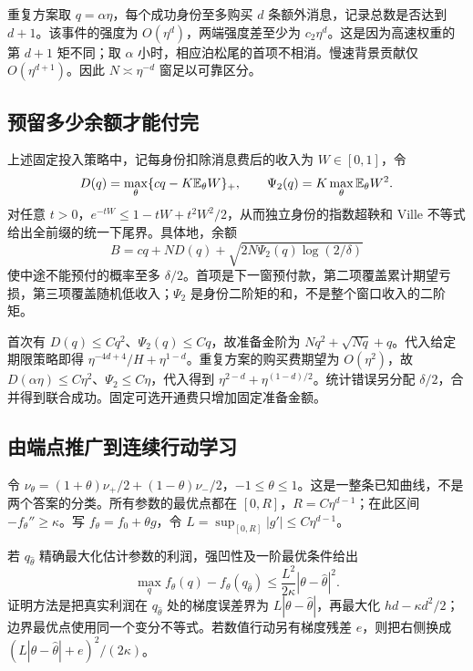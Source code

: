 重复方案取 $q=\alpha\eta$，每个成功身份至多购买 $d$ 条额外消息，记录总数是否达到 $d+1$。该事件的强度为 $O(\eta^d)$，两端强度差至少为 $c_2\eta^d$。这是因为高速权重的第 $d+1$ 矩不同；取 $\alpha$ 小时，相应泊松尾的首项不相消。慢速背景贡献仅 $O(\eta^{d+1})$。因此 $N\asymp\eta^{-d}$ 窗足以可靠区分。

\subsection{预留多少余额才能付完}
上述固定投入策略中，记每身份扣除消息费后的收入为 $W\in[0,1]$，令
\[
 D(q)=\max_\theta\{cq-K\mathbb E_\theta W\}_+,
 \qquad \Psi_2(q)=K\max_\theta\mathbb E_\theta W^2.
\]
对任意 $t>0$，$e^{-tW}\leq1-tW+t^2W^2/2$，从而独立身份的指数超鞅和 Ville 不等式给出全前缀的统一下尾界。具体地，余额
\begin{equation}\label{eq:reserve}
 B=cq+ND(q)+\sqrt{2N\Psi_2(q)\log(2/\delta)}
\end{equation}
使中途不能预付的概率至多 $\delta/2$。首项是下一窗预付款，第二项覆盖累计期望亏损，第三项覆盖随机低收入；$\Psi_2$ 是身份二阶矩的和，不是整个窗口收入的二阶矩。

首次有 $D(q)\leq Cq^2$、$\Psi_2(q)\leq Cq$，故准备金阶为 $Nq^2+\sqrt{Nq}+q$。代入给定期限策略即得 $\eta^{-4d+4}/H+\eta^{1-d}$。重复方案的购买费期望为 $O(\eta^2)$，故 $D(\alpha\eta)\leq C\eta^2$、$\Psi_2\leq C\eta$，代入得到 $\eta^{2-d}+\eta^{(1-d)/2}$。统计错误另分配 $\delta/2$，合并得到联合成功。固定可选开通费只增加固定准备金额。

\subsection{由端点推广到连续行动学习}
令 $\nu_\theta=(1+\theta)\nu_+/2+(1-\theta)\nu_-/2$，$-1\leq\theta\leq1$。这是一整条已知曲线，不是两个答案的分类。所有参数的最优点都在 $[0,R]$，$R=C\eta^{d-1}$；在此区间 $-f_\theta''\geq\kappa$。写 $f_\theta=f_0+\theta g$，令 $L=\sup_{[0,R]}|g'|\leq C\eta^{d-1}$。

若 $q_{\widehat\theta}$ 精确最大化估计参数的利润，强凹性及一阶最优条件给出
\begin{equation}\label{eq:localaction}
 \max_q f_\theta(q)-f_\theta(q_{\widehat\theta})
 \leq\frac{L^2}{2\kappa}|\theta-\widehat\theta|^2.
\end{equation}
证明方法是把真实利润在 $q_{\widehat\theta}$ 处的梯度误差界为 $L|\theta-\widehat\theta|$，再最大化 $hd-\kappa d^2/2$；边界最优点使用同一个变分不等式。若数值行动另有梯度残差 $e$，则把右侧换成 $(L|\theta-\widehat\theta|+e)^2/(2\kappa)$。

